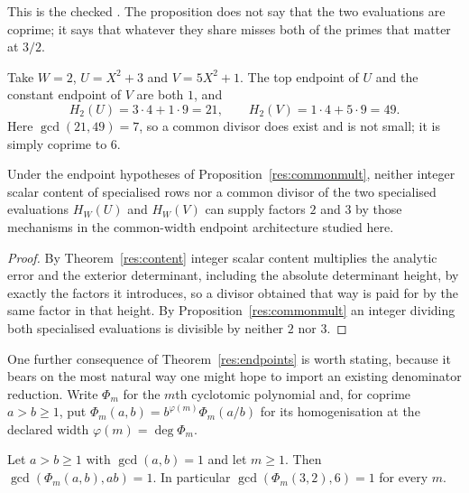 \documentclass[11pt]{article}
\begin{document}
\noindent This is the checked
.  The proposition does not say that the two evaluations are coprime;
it says that whatever they share misses both of the primes that matter at
\(3/2\).

\begin{example}\label{ex:commonmult}
Take \(W=2\), \(U=X^2+3\) and \(V=5X^2+1\).  The top endpoint of \(U\) and the
constant endpoint of \(V\) are both \(1\), and
\[
 H_2(U)=3\cdot4+1\cdot9=21,\qquad H_2(V)=1\cdot4+5\cdot9=49 .
\]
Here \(\gcd(21,49)=7\), so a common divisor does exist and is not small; it
is simply coprime to \(6\).
\end{example}

\begin{corollary}\label{res:nomult}
Under the endpoint hypotheses of Proposition~\ref{res:commonmult}, neither
integer scalar content of specialised rows nor a common divisor of the two specialised
evaluations \(H_W(U)\) and \(H_W(V)\) can supply factors \(2\) and \(3\) by
those mechanisms in the common-width endpoint architecture studied here.
\end{corollary}

\begin{proof}
By Theorem~\ref{res:content} integer scalar content multiplies the analytic error and
the exterior determinant, including the absolute determinant height, by exactly
the factors it introduces, so a divisor obtained that way is paid for by the
same factor in that height.  By Proposition~\ref{res:commonmult} an integer
dividing both specialised evaluations is divisible by neither \(2\) nor \(3\).
\end{proof}

One further consequence of Theorem~\ref{res:endpoints} is worth stating,
because it bears on the most natural way one might hope to import an existing
denominator reduction.  Write $\Phi_m$ for the $m$th cyclotomic polynomial and,
for coprime $a>b\ge1$, put $\Phi_m(a,b)=b^{\varphi(m)}\Phi_m(a/b)$ for its
homogenisation at the declared width $\varphi(m)=\deg\Phi_m$.

\begin{proposition}
\label{res:cyclounit}
Let $a>b\ge1$ with $\gcd(a,b)=1$ and let $m\ge1$.  Then
$\gcd(\Phi_m(a,b),ab)=1$.  In particular $\gcd(\Phi_m(3,2),6)=1$ for every $m$.
\end{proposition}
\end{document}
